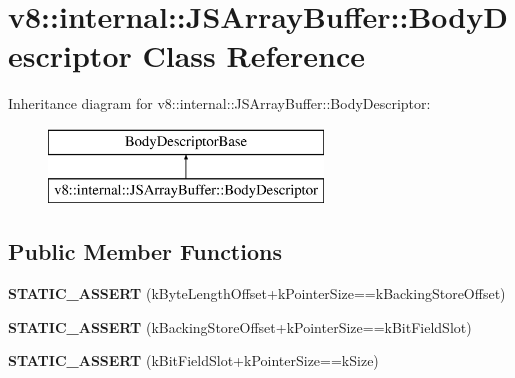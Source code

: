 \hypertarget{classv8_1_1internal_1_1_j_s_array_buffer_1_1_body_descriptor}{}\section{v8\+:\+:internal\+:\+:J\+S\+Array\+Buffer\+:\+:Body\+Descriptor Class Reference}
\label{classv8_1_1internal_1_1_j_s_array_buffer_1_1_body_descriptor}
Inheritance diagram for v8\+:\+:internal\+:\+:J\+S\+Array\+Buffer\+:\+:Body\+Descriptor\+:\begin{figure}[H]
\begin{center}
\leavevmode
\includegraphics[height=2.000000cm]{classv8_1_1internal_1_1_j_s_array_buffer_1_1_body_descriptor}
\end{center}
\end{figure}
\subsection*{Public Member Functions}
\begin{DoxyCompactItemize}
\item 
{\bfseries S\+T\+A\+T\+I\+C\+\_\+\+A\+S\+S\+E\+RT} (k\+Byte\+Length\+Offset+k\+Pointer\+Size==k\+Backing\+Store\+Offset)\hypertarget{classv8_1_1internal_1_1_j_s_array_buffer_1_1_body_descriptor_afbac92c12eb2b6934f88a348fd0cbae0}{}\label{classv8_1_1internal_1_1_j_s_array_buffer_1_1_body_descriptor_afbac92c12eb2b6934f88a348fd0cbae0}

\item 
{\bfseries S\+T\+A\+T\+I\+C\+\_\+\+A\+S\+S\+E\+RT} (k\+Backing\+Store\+Offset+k\+Pointer\+Size==k\+Bit\+Field\+Slot)\hypertarget{classv8_1_1internal_1_1_j_s_array_buffer_1_1_body_descriptor_abe19ffd7aa8e27c876ef638544c54c14}{}\label{classv8_1_1internal_1_1_j_s_array_buffer_1_1_body_descriptor_abe19ffd7aa8e27c876ef638544c54c14}

\item 
{\bfseries S\+T\+A\+T\+I\+C\+\_\+\+A\+S\+S\+E\+RT} (k\+Bit\+Field\+Slot+k\+Pointer\+Size==k\+Size)\hypertarget{classv8_1_1internal_1_1_j_s_array_buffer_1_1_body_descriptor_aa96fcde21a25707f6b5ee86c240bc87b}{}\label{classv8_1_1internal_1_1_j_s_array_buffer_1_1_body_descriptor_aa96fcde21a25707f6b5ee86c240bc87b}

\end{DoxyCompactItemize}

